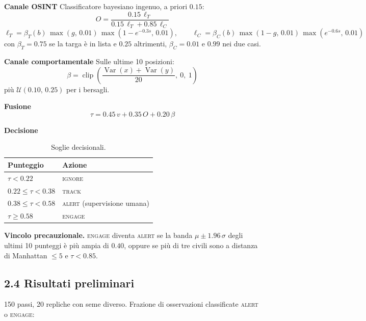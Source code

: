 \documentclass[a4paper, 11pt]{article}
\begin{document}
\textbf{Canale OSINT} Classificatore bayesiano ingenuo, a priori $0.15$:
\begin{equation}
O = \frac{0.15\,\ell_T}{0.15\,\ell_T + 0.85\,\ell_C}
\end{equation}
\[
\ell_T = \beta_T(b)\,\max(g,\, 0.01)\,\max(1 - e^{-0.3 s},\, 0.01), \qquad
\ell_C = \beta_C(b)\,\max(1 - g,\, 0.01)\,\max(e^{-0.6 s},\, 0.01)
\]
con $\beta_T = 0.75$ se la targa è in lista e $0.25$ altrimenti,
$\beta_C = 0.01$ e $0.99$ nei due casi.

\textbf{Canale comportamentale} Sulle ultime 10 posizioni:
\begin{equation}
\beta = \operatorname{clip}\!\left(\frac{\operatorname{Var}(x) + \operatorname{Var}(y)}{20},\ 0,\ 1\right)
\end{equation}
più $\mathcal{U}(0.10,\, 0.25)$ per i bersagli.

\textbf{Fusione}
\begin{equation}
\tau = 0.45\, v + 0.35\, O + 0.20\, \beta
\end{equation}

\textbf{Decisione}

\begin{table}[h]
\centering
\begin{tabular}{ll}
\toprule
\textbf{Punteggio} & \textbf{Azione} \\
\midrule
$\tau < 0.22$ & \textsc{ignore} \\
$0.22 \le \tau < 0.38$ & \textsc{track} \\
$0.38 \le \tau < 0.58$ & \textsc{alert} (supervisione umana) \\
$\tau \ge 0.58$ & \textsc{engage} \\
\bottomrule
\end{tabular}
\caption{Soglie decisionali.}
\label{tab:azioni}
\end{table}

\textbf{Vincolo precauzionale.} \textsc{engage} diventa \textsc{alert} se la
banda $\mu \pm 1.96\,\sigma$ degli ultimi 10 punteggi è più ampia di $0.40$,
oppure se più di tre civili sono a distanza di Manhattan $\leq 5$ e
$\tau < 0.85$.

\subsection*{2.4 Risultati preliminari}

150 passi, 20 repliche con seme diverso. Frazione di osservazioni classificate
\textsc{alert} o \textsc{engage}:
\end{document}
